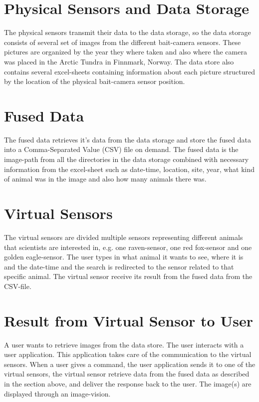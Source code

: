 \documentclass[USenglish]{uit-thesis}
\begin{document}
\section{Physical Sensors and Data Storage}
The physical sensors transmit their data to the data storage, so the data storage consists of several set of images from the different bait-camera sensors. These pictures are organized by the year they where taken and also where the camera was placed in the Arctic Tundra in Finnmark, Norway. 
The data store also contains several excel-sheets containing information about each picture structured by the location of the physical bait-camera sensor position.

\section{Fused Data}
The fused data retrieves it's data from the data storage and store the fused data into a Comma-Separated Value (CSV) file on demand. The fused data is the image-path from all the directories in the data storage combined with necessary information from the excel-sheet such as date-time, location, site, year, what kind of animal was in the image and also how many animals there was.

\section{Virtual Sensors}
The virtual sensors are divided multiple sensors representing different animals that scientists are interested in, e.g. one raven-sensor, one red fox-sensor and one golden eagle-sensor.
The user types in what animal it wants to see, where it is and the date-time and the search is redirected to the sensor related to that specific animal. The virtual sensor receive its result from the fused data from the CSV-file.

\section{Result from Virtual Sensor to User}
A user wants to retrieve images from the data store.
The user interacts with a user application. This application takes care of the communication to the virtual sensors. When a user gives a command, the user application sends it to one of the virtual sensors, the virtual sensor retrieve data from the fused data as described in the section above, and deliver the response back to the user. The image(s) are displayed through an image-vision.
\end{document}

